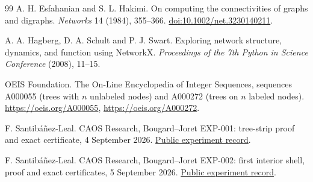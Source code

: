 \documentclass[11pt]{article}
\theoremstyle{remark}
\begin{document}
\begin{thebibliography}{99}
 A. H. Esfahanian and S. L. Hakimi.
On computing the connectivities of graphs and digraphs.
\emph{Networks} 14 (1984), 355--366.
\href{https://doi.org/10.1002/net.3230140211}{doi:10.1002/net.3230140211}.

 A. A. Hagberg, D. A. Schult and P. J. Swart.
Exploring network structure, dynamics, and function using NetworkX.
\emph{Proceedings of the 7th Python in Science Conference} (2008), 11--15.

 OEIS Foundation.
The On-Line Encyclopedia of Integer Sequences, sequences A000055 (trees with $n$ unlabeled nodes) and A000272 (trees on $n$ labeled nodes).
\url{https://oeis.org/A000055}, \url{https://oeis.org/A000272}.

 F. Santib\'a\~nez-Leal.
CAOS Research, Bougard--Joret EXP-001: tree-strip proof and exact certificate, 4 September 2026.
\href{https://github.com/fsantibanezleal/CAOS_RESEARCH/tree/main/problems/combinatorics/bougard-joret/experiments/EXP-001-tree-strip}{Public experiment record}.

 F. Santib\'a\~nez-Leal.
CAOS Research, Bougard--Joret EXP-002: first interior shell, proof and exact certificates, 5 September 2026.
\href{https://github.com/fsantibanezleal/CAOS_RESEARCH/tree/main/problems/combinatorics/bougard-joret/experiments/EXP-002-next-shell}{Public experiment record}.
\end{thebibliography}
\end{document}
